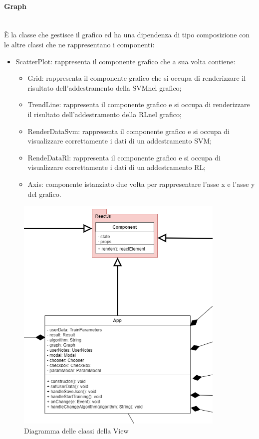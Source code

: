 		\paragraph*{Graph} \mbox{} \\[1mm]
		È la classe che gestisce il grafico ed ha una dipendenza di tipo composizione con le altre classi che ne rappresentano i componenti:
		\begin{itemize}
			\item ScatterPlot: rappresenta il componente grafico che a sua volta contiene: \begin{itemize}
				\item Grid: rappresenta il componente grafico che si occupa di renderizzare il risultato dell'addestramento della SVM\glosp nel grafico;
				\item TrendLine: rappresenta il componente grafico e si occupa di renderizzare il risultato dell'addestramento della RL\glosp nel grafico;
				\item RenderDataSvm: rappresenta il componente grafico e si occupa di visualizzare correttamente i dati di un addestramento SVM\glo;
				\item RendeDataRl: rappresenta il componente grafico e si occupa di visualizzare correttamente i dati di un addestramento RL\glo;
				\item Axis: componente istanziato due volta per rappresentare l'asse x e l'asse y del grafico.
			\end{itemize}
		\end{itemize}
		\mbox{}
				\begin{figure} [H]
					\begin{center}
						\includegraphics[width=100mm]{img/Diagrammi/view-app.png}
					\end{center}
					\caption{Diagramma delle classi della View}
				\end{figure}
	
